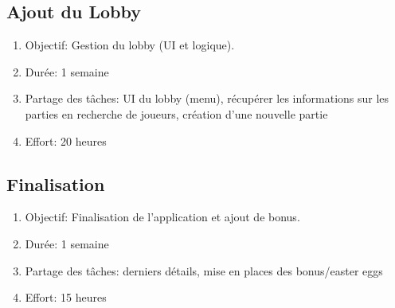 \documentclass[a4paper,11pt]{article}
\begin{document}
		\subsection{Ajout du Lobby}
		\begin{enumerate}
			\item[] Objectif: Gestion du lobby (UI et logique).
			\item[] Durée: 1 semaine
			\item[] Partage des tâches: UI du lobby (menu), récupérer les informations sur les parties en recherche de joueurs, création d'une nouvelle partie 
			\item[] Effort: 20 heures
		\end{enumerate}
		\subsection{Finalisation}
		\begin{enumerate}
			\item[] Objectif: Finalisation de l'application et ajout de bonus.
			\item[] Durée: 1 semaine
			\item[] Partage des tâches: derniers détails, mise en places des bonus/easter eggs
			\item[] Effort: 15 heures
		\end{enumerate}
\end{document}
